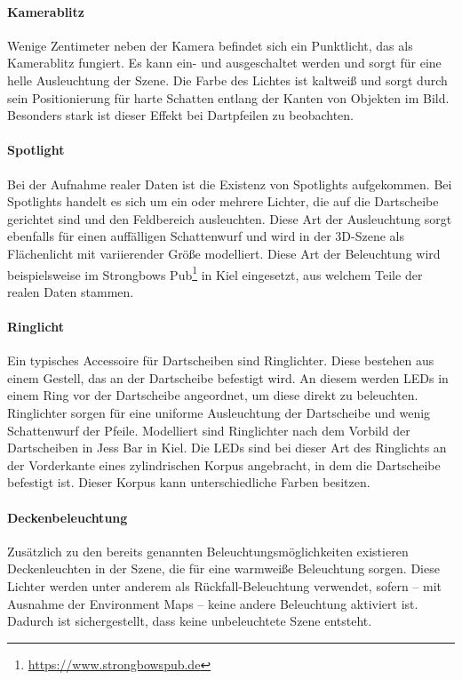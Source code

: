 \paragraph{Kamerablitz}

Wenige Zentimeter neben der Kamera befindet sich ein Punktlicht, das als Kamerablitz fungiert. Es kann ein- und ausgeschaltet werden und sorgt für eine helle Ausleuchtung der Szene. Die Farbe des Lichtes ist kaltweiß und sorgt durch sein Positionierung für harte Schatten entlang der Kanten von Objekten im Bild. Besonders stark ist dieser Effekt bei Dartpfeilen zu beobachten.

\paragraph{Spotlight}

Bei der Aufnahme realer Daten ist die Existenz von Spotlights aufgekommen. Bei Spotlights handelt es sich um ein oder mehrere Lichter, die auf die Dartscheibe gerichtet sind und den Feldbereich ausleuchten. Diese Art der Ausleuchtung sorgt ebenfalls für einen auffälligen Schattenwurf und wird in der 3D-Szene als Flächenlicht mit variierender Größe modelliert. Diese Art der Beleuchtung wird beispielsweise im Strongbows Pub\footnote{\url{https://www.strongbowspub.de}} in Kiel eingesetzt, aus welchem Teile der realen Daten stammen.

\paragraph{Ringlicht}

Ein typisches Accessoire für Dartscheiben sind Ringlichter. Diese bestehen aus einem Gestell, das an der Dartscheibe befestigt wird. An diesem werden LEDs in einem Ring vor der Dartscheibe angeordnet, um diese direkt zu beleuchten. Ringlichter sorgen für eine uniforme Ausleuchtung der Dartscheibe und wenig Schattenwurf der Pfeile. Modelliert sind Ringlichter nach dem Vorbild der Dartscheiben in Jess Bar in Kiel. Die LEDs sind bei dieser Art des Ringlichts an der Vorderkante eines zylindrischen Korpus angebracht, in dem die Dartscheibe befestigt ist. Dieser Korpus kann unterschiedliche Farben besitzen.

\paragraph{Deckenbeleuchtung}

Zusätzlich zu den bereits genannten Beleuchtungsmöglichkeiten existieren Deckenleuchten in der Szene, die für eine warmweiße Beleuchtung sorgen. Diese Lichter werden unter anderem als Rückfall-Beleuchtung verwendet, sofern -- mit Ausnahme der Environment Maps -- keine andere Beleuchtung aktiviert ist. Dadurch ist sichergestellt, dass keine unbeleuchtete Szene entsteht.

